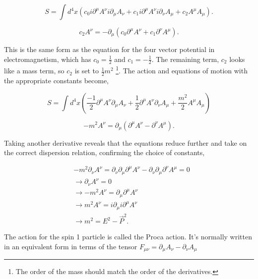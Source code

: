 \begin{equation}
S = \int d^4x \left( c_0 i\partial^\mu A^\nu i\partial_\mu A_\nu + c_1 i\partial^\mu A^\nu i\partial_\nu A_\mu + c_2 A^\mu A_\mu \right).
\end{equation}

\begin{equation}
c_2 A^\nu = -\partial_\mu\left(c_0 \partial^\mu A^\nu + c_1 \partial^\nu A^\mu\right).
\end{equation}

This is the same form as the equation for the four vector potential in electromagnetism, which has $c_0 = \frac{1}{2}$ and $c_1 =-\frac{1}{2}$. The remaining term, $c_2$ looks like a mass term, so $c_2$ is set to $\frac{1}{2}m^2$ \footnote{The order of the mass should match the order of the derivatives.}. The action and equations of motion with the appropriate constants become, 

\begin{equation}
S = \int d^4x \left( \frac{-1}{2} \partial^\mu A^\nu\partial_\mu A_\nu + \frac{1}{2} \partial^\mu A^\nu\partial_\nu A_\mu + \frac{m^2}{2} A^\mu A_\mu \right)
\end{equation}

\begin{equation}
-m^2 A^\nu = \partial_\mu\left(\partial^\mu A^\nu - \partial^\nu A^\mu\right).
\end{equation}

Taking another derivative reveals that the equations reduce further and take on the correct dispersion relation, confirming the choice of constants,

\begin{equation}
\begin{split}
&-m^2 \partial_\nu A^\nu = \partial_\nu \partial_\mu \partial^\mu A^\nu - \partial_\nu \partial_\mu \partial^\nu A^\mu = 0 \\
&\rightarrow \partial_\nu A^\nu = 0 \\
&\rightarrow -m^2 A^\nu = \partial_\mu\partial^\mu A^\nu \\
&\rightarrow m^2 A^\nu = i\partial_\mu i\partial^\mu A^\nu \\
&\rightarrow m^2 = E^2 - \vec{P}^2.
\end{split}
\end{equation}

The action for the spin 1 particle is called the Proca action. It's normally written in an equivalent form in terms of the tensor $F_{\mu\nu} = \partial_\mu A_\nu - \partial_\nu A_\mu$

